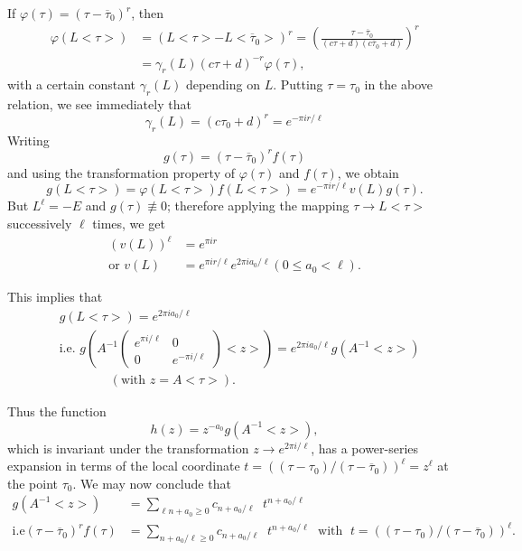 If $\varphi(\tau)=(\tau -\overline{\tau}_0)^r$, then
\begin{align*}
\varphi(L<\tau>) & = (L<\tau>-L<\overline{\tau}_0>)^r =
\left(\frac{\tau-\overline{\tau}_0}{(c\tau+d)(c\overline{\tau}_0
  +d)}\right)^r \\
& = \gamma_r (L) (c\tau +d)^{-r} \varphi(\tau),
\end{align*}
with a certain constant $\gamma_r(L)$ depending on $L$. Putting
$\tau=\tau_0$ in the above relation, we see immediately that 
$$
\gamma_r(L) = (c\tau_0+d)^r = e^{-\pi i r/\ell}
$$
Writing 
$$
g(\tau) = (\tau -\overline{\tau}_0)^r f(\tau)
$$
and using the transformation property of $\varphi(\tau)$ and
$f(\tau)$, we obtain
$$
g(L<\tau>) = \varphi(L<\tau>) f(L<\tau>) = e^{-\pi i r/\ell} v(L)
g(\tau). 
$$\pageoriginale
But $L^{\ell}=-E$ and $g(\tau)\not\equiv 0$; therefore applying the
mapping $\tau\to L<\tau>$ successively $\ell$ times, we get 
\begin{align*}
(v(L))^{\ell} & = e^{\pi i r}\\
\text{or } v(L) & = e^{\pi i r/\ell} e^{2\pi i a_0/\ell}
(0\leq a_0 < \ell).
\end{align*}

This implies that 
\begin{align*}
&g(L<\tau>)  = e^{2\pi i a_0/\ell}\\
&\text{i.e. } g(A^{-1} \begin{pmatrix} e^{\pi i /\ell} &
  0\\
0 & e^{-\pi i /\ell}\end{pmatrix}<z>) =e^{2\pi i a_0/\ell}
g(A^{-1}<z>)\\ 
&\qquad\qquad (\text{with } z=A<\tau>).
\end{align*}

Thus the function 
$$
h(z) = z^{-a_0} g(A^{-1}<z>),
$$
which is invariant under the transformation $z\to e^{2\pi i /\ell}$,
has a power-series expansion in terms of the local coordinate
$t=((\tau-\tau_0)/(\tau-\overline{\tau}_0))^{\ell}=z^{\ell}$ at the
point $\tau_0$. We may now conclude that 
\begin{align*}
g(A^{-1}<z>) & = \sum_{\ell n + a_0 \geq 0} c_{n+a_0/\ell}
\;\; t^{n+a_0/\ell}\\
\text{i.e} (\tau-\overline{\tau}_0)^r f(\tau) & = \sum_{n+a_0/\ell
  \geq 0} c_{n+a_0/\ell} \;\; t^{n+a_0/\ell} \; \text{ with } \; 
t=((\tau-\tau_0)/(\tau-\overline{\tau}_0))^{\ell}.\tag{5}\label{c3:eq1:5}
\end{align*}


